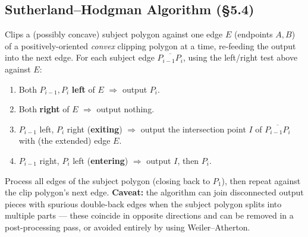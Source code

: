 \documentclass[12pt, a4paper]{article}
\newenvironment{answerbox}{\begin{mdframed}[style=answerframe]}{\end{mdframed}}
\begin{document}
\subsection{Sutherland--Hodgman Algorithm (\S5.4)}
\begin{answerbox}
Clips a (possibly concave) subject polygon against one edge $E$ (endpoints $A,B$) of a positively-oriented \emph{convex} clipping polygon at a time, re-feeding the output into the next edge. For each subject edge $\overline{P_{i-1}P_i}$, using the left/right test above against $E$:
\begin{enumerate}[noitemsep]
  \item Both $P_{i-1},P_i$ \textbf{left} of $E$ $\Rightarrow$ output $P_i$.
  \item Both \textbf{right} of $E$ $\Rightarrow$ output nothing.
  \item $P_{i-1}$ left, $P_i$ right (\textbf{exiting}) $\Rightarrow$ output the intersection point $I$ of $\overline{P_{i-1}P_i}$ with (the extended) edge $E$.
  \item $P_{i-1}$ right, $P_i$ left (\textbf{entering}) $\Rightarrow$ output $I$, then $P_i$.
\end{enumerate}
Process all edges of the subject polygon (closing back to $P_1$), then repeat against the clip polygon's next edge. \textbf{Caveat:} the algorithm can join disconnected output pieces with spurious double-back edges when the subject polygon splits into multiple parts --- these coincide in opposite directions and can be removed in a post-processing pass, or avoided entirely by using Weiler--Atherton.
\end{answerbox}

\end{document}
